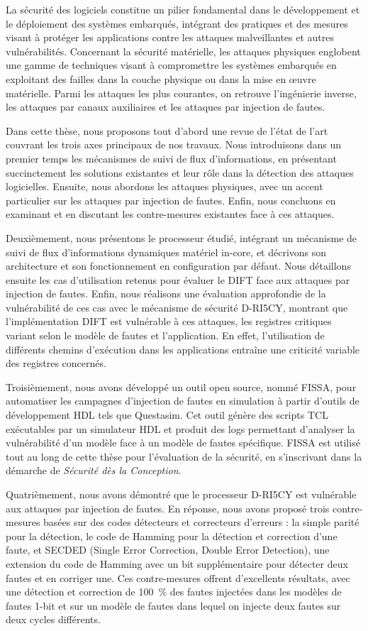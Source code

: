 La sécurité des logiciels constitue un pilier fondamental dans le développement et le déploiement des systèmes embarqués, intégrant des pratiques et des mesures visant à protéger les applications contre les attaques malveillantes et autres vulnérabilités. Concernant la sécurité matérielle, les attaques physiques englobent une gamme de techniques visant à compromettre les systèmes embarqués en exploitant des failles dans la couche physique ou dans la mise en œuvre matérielle. Parmi les attaques les plus courantes, on retrouve l’ingénierie inverse, les attaques par canaux auxiliaires et les attaques par injection de fautes.

Dans cette thèse, nous proposons tout d’abord une revue de l’état de l’art couvrant les trois axes principaux de nos travaux. Nous introduisons dans un premier temps les mécanismes de suivi de flux d’informations, en présentant succinctement les solutions existantes et leur rôle dans la détection des attaques logicielles. Ensuite, nous abordons les attaques physiques, avec un accent particulier sur les attaques par injection de fautes. Enfin, nous concluons en examinant et en discutant les contre-mesures existantes face à ces attaques.

Deuxièmement, nous présentons le processeur étudié, intégrant un mécanisme de suivi de flux d’informations dynamiques matériel in-core, et décrivons son architecture et son fonctionnement en configuration par défaut. Nous détaillons ensuite les cas d'utilisation retenus pour évaluer le DIFT face aux attaques par injection de fautes. Enfin, nous réalisons une évaluation approfondie de la vulnérabilité de ces cas avec le mécanisme de sécurité D-RI5CY, montrant que l'implémentation DIFT est vulnérable à ces attaques, les registres critiques variant selon le modèle de fautes et l'application. En effet, l’utilisation de différents chemins d’exécution dans les applications entraîne une criticité variable des registres concernés.

Troisièmement, nous avons développé un outil open source, nommé FISSA, pour automatiser les campagnes d’injection de fautes en simulation à partir d'outils de développement HDL tels que Questasim. Cet outil génère des scripts TCL exécutables par un simulateur HDL et produit des logs permettant d’analyser la vulnérabilité d’un modèle face à un modèle de fautes spécifique. FISSA est utilisé tout au long de cette thèse pour l’évaluation de la sécurité, en s’inscrivant dans la démarche de \textit{Sécurité dès la Conception}.

Quatrièmement, nous avons démontré que le processeur D-RI5CY est vulnérable aux attaques par injection de fautes. En réponse, nous avons proposé trois contre-mesures basées sur des codes détecteurs et correcteurs d’erreurs : la simple parité pour la détection, le code de Hamming pour la détection et correction d’une faute, et SECDED (Single Error Correction, Double Error Detection), une extension du code de Hamming avec un bit supplémentaire pour détecter deux fautes et en corriger une. Ces contre-mesures offrent d'excellents résultats, avec une détection et correction de 100~\% des fautes injectées dans les modèles de fautes 1-bit et sur un modèle de fautes dans lequel on injecte deux fautes sur deux cycles différents.

